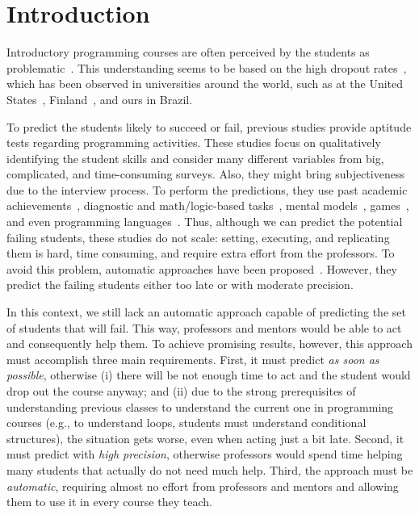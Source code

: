 \section{Introduction}

Introductory programming courses are often perceived by the students as problematic~\cite{yadin-inroads-acm-11}. This understanding seems to be based on the high dropout rates~\cite{camel-2006, what-works-cacm-2013}, which has been observed in universities around the world, such as at the United States~\cite{bennedsen-sigcse-failure-rates-2007}, Finland~\cite{why-dropout-icer06}, and ours in Brazil.

To predict the students likely to succeed or fail, previous studies provide aptitude tests regarding programming activities. These studies focus on qualitatively identifying the student skills and consider many different variables from big, complicated, and time-consuming surveys. Also, they might bring subjectiveness due to the interview process. To perform the predictions, they use past academic achievements~\cite{hostetler-aptitude-1983, butcher-predictor-high-school-1985}, diagnostic and math/logic-based tasks~\cite{simon-predictors-ace2006, ibm-aptitude-test}, mental models~\cite{camel-2006}, games~\cite{lorenzenC06-mastermind-predictor-sigcse2008}, and even programming languages~\cite{harris-assembly-jcsc2014}. Thus, although we can predict the potential failing students, these studies do not scale: setting, executing, and replicating them is hard, time consuming, and require extra effort from the professors. To avoid this problem, automatic approaches have been proposed~\cite{watson-icalt-2013, emily-icer-2011}. However, they predict the failing students either too late or with moderate precision.

In this context, we still lack an automatic approach capable of predicting the set of students that will fail. This way, professors and mentors would be able to act and consequently help them. To achieve promising results, however, this approach must accomplish three main requirements. First, it must predict \textit{as soon as possible}, otherwise (i) there will be not enough time to act and the student would drop out the course anyway; and (ii) due to the strong prerequisites of understanding previous classes to understand the current one in programming courses (e.g., to understand loops, students must understand conditional structures), the situation gets worse, even when acting just a bit late. Second, it must predict with \textit{high precision}, otherwise professors would spend time helping many students that actually do not need much help. Third, the approach must be \textit{automatic}, requiring almost no effort from professors and mentors and allowing them to use it in every course they teach.

